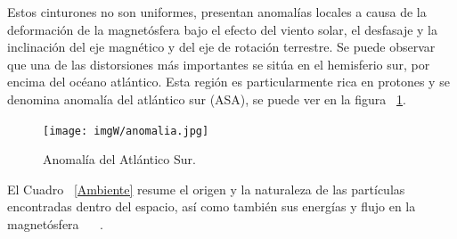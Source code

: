 \documentclass[a4paper,openright,12pt]{report}
\begin{document}
Estos cinturones no son uniformes, presentan  anomalías locales a causa de la deformación de la magnetósfera bajo el efecto del viento solar, el desfasaje y la inclinación del eje magnético y del eje  de rotación terrestre. Se puede observar que una de las distorsiones más importantes se sitúa en el hemisferio sur, por encima del océano atlántico. Esta región es particularmente rica en protones y se denomina  anomalía del atlántico sur (ASA), se puede ver en la figura ~\ref{anomalia}.
%
%
%
%

\begin{figure}[H]
	\centering
	\texttt{[image: imgW/anomalia.jpg]}
	\caption{Anomalía del Atlántico Sur. }\cite{NASA3}
	\label{anomalia}
\end{figure}



El Cuadro  ~\ref{Ambiente} resume el origen y la naturaleza de las partículas encontradas dentro del espacio, así como también sus energías y  flujo en la magnetósfera ~\cite{boudenot1995}  ~\cite{la1995latchup}.
\end{document}

